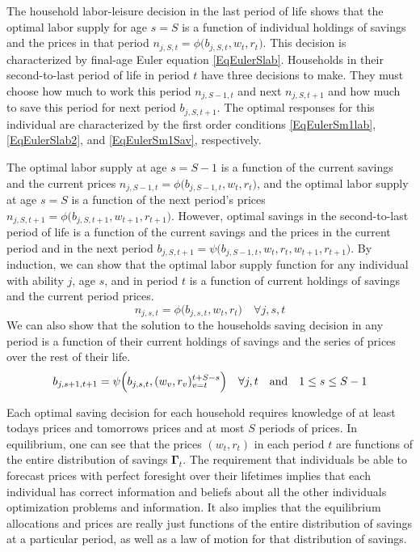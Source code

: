 \documentclass[letterpaper,12pt]{article}
\theoremstyle{definition}
\begin{document}
    \begin{spacing}{1.5}
    \vspace{10mm}

    \noindent The household labor-leisure decision in the last period of life shows that the optimal labor supply for age $s=S$ is a function of individual holdings of savings and the prices in that period $n_{j,S,t}=\phi\bigl(b_{j,S,t},w_t,r_t\bigr)$. This decision is characterized by final-age Euler equation \eqref{EqEulerSlab}. Households in their second-to-last period of life in period $t$ have three decisions to make. They must choose how much to work this period $n_{j,S-1,t}$ and next $n_{j,S,t+1}$ and how much to save this period for next period $b_{j,S,t+1}$. The optimal responses for this individual are characterized by the first order conditions \eqref{EqEulerSm1lab}, \eqref{EqEulerSlab2}, and \eqref{EqEulerSm1Sav}, respectively.

    The optimal labor supply at age $s=S-1$ is a function of the current savings and the current prices $n_{j,S-1,t}=\phi\bigl(b_{j,S-1,t},w_t,r_t\bigr)$, and the optimal labor supply at age $s=S$ is a function of the next period's prices $n_{j,S,t+1}=\phi\bigl(b_{j,S,t+1},w_{t+1},r_{t+1}\bigr)$. However, optimal savings in the second-to-last period of life is a function of the current savings and the prices in the current period and in the next period $b_{j,S,t+1} = \psi\bigl(b_{j,S-1,t},w_t,r_t,w_{t+1},r_{t+1}\bigr)$. By induction, we can show that the optimal labor supply function for any individual with ability $j$, age $s$, and in period $t$ is a function of current holdings of savings and the current period prices.
    \begin{equation}\label{EqLabPolFuncGen}
      n_{j,s,t} = \phi\bigl(b_{j,s,t},w_t,r_t\bigr) \quad\forall j,s,t
    \end{equation}
    We can also show that the solution to the households saving decision in any period is a function of their current holdings of savings and the series of prices over the rest of their life.
    \begin{equation}\label{EqSavPolFuncGen}
      b_{j,s+1,t+1} = \psi\Bigl(b_{j,s,t},(w_v,r_v)_{v=t}^{t+S-s}\Bigr) \quad\forall j,t \quad\text{and}\quad 1\leq s\leq S-1
    \end{equation}

    Each optimal saving decision for each household requires knowledge of at least todays prices and tomorrows prices and at most $S$ periods of prices. In equilibrium, one can see that the prices $(w_t,r_t)$ in each period $t$ are functions of the entire distribution of savings $\bm{\Gamma}_t$. The requirement that individuals be able to forecast prices with perfect foresight over their lifetimes implies that each individual has correct information and beliefs about all the other individuals optimization problems and information. It also implies that the equilibrium allocations and prices are really just functions of the entire distribution of savings at a particular period, as well as a law of motion for that distribution of savings.


\end{spacing}
\end{document}
